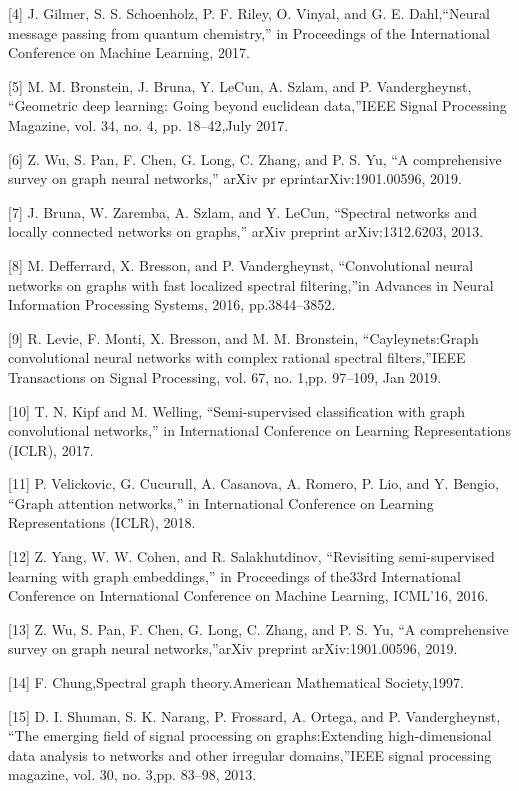 \documentclass{article}
\begin{document}
[4] J. Gilmer, S. S. Schoenholz, P. F. Riley, O. Vinyal, and G. E. Dahl,“Neural message passing from quantum chemistry,” in Proceedings of the International Conference on Machine Learning, 2017.

[5] M.  M.  Bronstein,  J.  Bruna,  Y.  LeCun,  A.  Szlam,  and  P.  Vandergheynst,  “Geometric  deep  learning:  Going  beyond  euclidean data,”IEEE  Signal  Processing  Magazine,  vol.  34,  no.  4,  pp.  18–42,July 2017.

[6] Z.  Wu,  S.  Pan,  F.  Chen,  G.  Long,  C.  Zhang,  and  P.  S.  Yu,  “A comprehensive survey on graph neural networks,” arXiv pr eprintarXiv:1901.00596, 2019.

[7] J.  Bruna,  W.  Zaremba,  A.  Szlam,  and  Y.  LeCun,  “Spectral  networks and locally connected networks on graphs,” arXiv preprint arXiv:1312.6203, 2013.

[8] M. Defferrard, X. Bresson, and P. Vandergheynst, “Convolutional neural networks on graphs with fast localized spectral filtering,”in Advances  in  Neural  Information  Processing  Systems,  2016,  pp.3844–3852.

[9] R. Levie, F. Monti, X. Bresson, and M. M. Bronstein, “Cayleynets:Graph convolutional neural networks with complex rational spectral  filters,”IEEE  Transactions  on  Signal  Processing,  vol.  67,  no.  1,pp. 97–109, Jan 2019.

[10]  T.  N.  Kipf  and  M.  Welling,  “Semi-supervised  classification  with graph   convolutional   networks,”   in International   Conference   on Learning Representations (ICLR), 2017.

[11]  P.  Velickovic,  G.  Cucurull,  A.  Casanova,  A.  Romero,  P.  Lio,  and Y. Bengio, “Graph attention networks,” in International Conference on Learning Representations (ICLR), 2018.

[12]  Z.  Yang,  W.  W.  Cohen,  and  R.  Salakhutdinov,  “Revisiting  semi-supervised learning with graph embeddings,” in Proceedings of the33rd International Conference on International Conference on Machine Learning, ICML’16, 2016.

[13]  Z.  Wu,  S.  Pan,  F.  Chen,  G.  Long,  C.  Zhang,  and  P.  S.  Yu,  “A comprehensive survey on graph neural networks,”arXiv preprint arXiv:1901.00596, 2019.

[14]  F. Chung,Spectral graph theory.American Mathematical Society,1997.

[15]  D.  I.  Shuman,  S.  K.  Narang,  P.  Frossard,  A.  Ortega,  and  P.  Vandergheynst, “The emerging field of signal processing on graphs:Extending high-dimensional data analysis to networks and other irregular domains,”IEEE signal processing magazine, vol. 30, no. 3,pp. 83–98, 2013.
\end{document}
